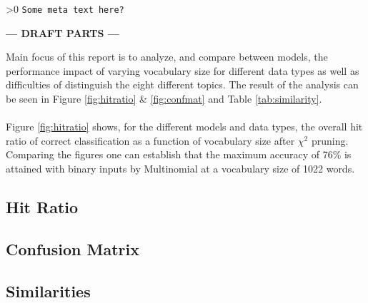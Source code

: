 \ifnum\printdraft>0
	\texttt{Some meta text here?}
\else
\begin{center}
	\textbf{--- DRAFT PARTS ---}
\end{center}
\fi

Main focus of this report is to analyze, and compare between models, the performance impact of varying vocabulary size for different data types as well as difficulties of distinguish the eight different topics. The result of the analysis can be seen in Figure \ref{fig:hitratio} \& \ref{fig:confmat} and Table \ref{tab:similarity}.\\\\
Figure \ref{fig:hitratio} shows, for the different models and data types, the overall hit ratio of correct classification as a function of vocabulary size after $\chi^2$ pruning. Comparing the figures one can establish that the maximum accuracy of 76\% is attained with binary inputs by Multinomial at a vocabulary size of 1022 words.

\onecolumn
\subsection{Hit Ratio}

\onecolumn
\subsection{Confusion Matrix}

\twocolumn
\subsection{Similarities}
